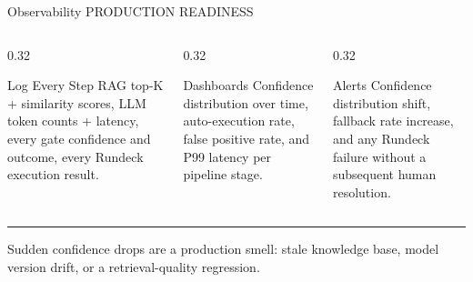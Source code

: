 \documentclass[aspectratio=169,10pt]{beamer}
\newcommand{\slidecat}[1]{{\color{cdim}\ttfamily\scriptsize\MakeUppercase{#1}}}
\begin{document}
\begin{frame}{Observability}
  \slidecat{Production Readiness}
  \vspace{0.2cm}
  \begin{columns}[T]
    \begin{column}{0.32\textwidth}
      \begin{block}{\color{cteal}\ttfamily\tiny Log Every Step}
        {\small RAG top-K + similarity scores, LLM token counts + latency, every gate confidence and outcome, every Rundeck execution result.}
      \end{block}
    \end{column}
    \begin{column}{0.32\textwidth}
      \begin{block}{\color{cteal}\ttfamily\tiny Dashboards}
        {\small Confidence distribution over time, auto-execution rate, false positive rate, and P99 latency per pipeline stage.}
      \end{block}
    \end{column}
    \begin{column}{0.32\textwidth}
      \begin{block}{\color{cteal}\ttfamily\tiny Alerts}
        {\small Confidence distribution shift, fallback rate increase, and any Rundeck failure without a subsequent human resolution.}
      \end{block}
    \end{column}
  \end{columns}
  \vspace{0.3cm}
  \rule{\textwidth}{0.3pt}
  {\color{cdim}\ttfamily\tiny Sudden confidence drops are a production smell: stale knowledge base, model version drift, or a retrieval-quality regression.}
\end{frame}
\end{document}
